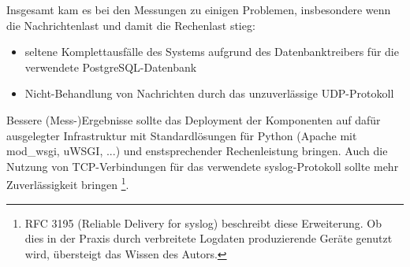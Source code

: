 Insgesamt kam es bei den Messungen zu einigen Problemen, insbesondere wenn die Nachrichtenlast und damit die Rechenlast stieg:
\begin{itemize}
\item seltene Komplettausfälle des Systems aufgrund des Datenbanktreibers für die verwendete PostgreSQL-Datenbank
\item Nicht-Behandlung von Nachrichten durch das unzuverlässige UDP-Protokoll
\end{itemize}
Bessere (Mess-)Ergebnisse sollte das Deployment der Komponenten auf dafür ausgelegter Infrastruktur mit Standardlösungen für Python (Apache mit mod\_wsgi, uWSGI, ...) und enstsprechender Rechenleistung bringen. Auch die Nutzung von TCP-Verbindungen für das verwendete syslog-Protokoll sollte mehr Zuverlässigkeit bringen \footnote{
  RFC 3195 (Reliable Delivery for syslog) beschreibt diese Erweiterung. Ob dies in der Praxis durch verbreitete Logdaten produzierende Geräte genutzt wird, übersteigt das Wissen des Autors.
}. 
